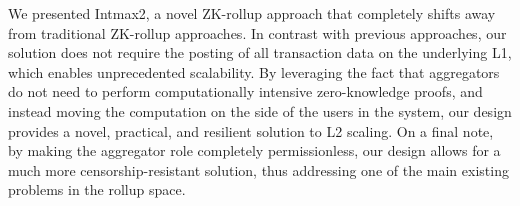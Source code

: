 We presented Intmax2, a novel ZK-rollup approach that completely shifts away from traditional ZK-rollup approaches. In contrast with previous approaches, our solution does not require the posting of all transaction data on the underlying L1, which enables unprecedented scalability. By leveraging the fact that aggregators do not need to perform computationally intensive zero-knowledge proofs, and instead moving the computation on the side of the users in the system, our design provides a novel, practical, and resilient solution to L2 scaling. On a final note, by making the aggregator role completely permissionless, our design allows for a much more censorship-resistant solution, thus addressing one of the main existing problems in the rollup space.